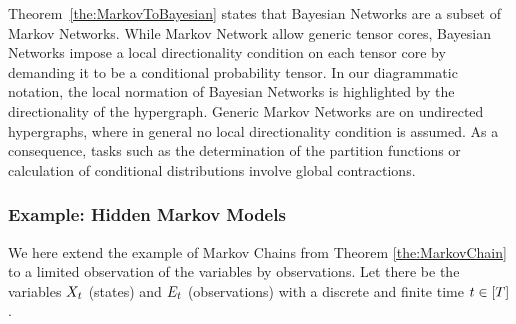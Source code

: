 
Theorem~\ref{the:MarkovToBayesian} states that Bayesian Networks are a subset of Markov Networks.
While Markov Network allow generic tensor cores, Bayesian Networks impose a local directionality condition on each tensor core by demanding it to be a conditional probability tensor.
In our diagrammatic notation, the local normation of Bayesian Networks is highlighted by the directionality of the hypergraph.
Generic Markov Networks are on undirected hypergraphs, where in general no local directionality condition is assumed.
As a consequence, tasks such as the determination of the partition functions or calculation of conditional distributions involve global contractions.




\subsubsection{Example: Hidden Markov Models}

We here extend the example of Markov Chains from Theorem \ref{the:MarkovChain} to a limited observation of the variables by observations.
Let there be the variables $X_{t}$ (states) and $E_{t}$ (observations) with a discrete and finite time $t\in[T]$.

